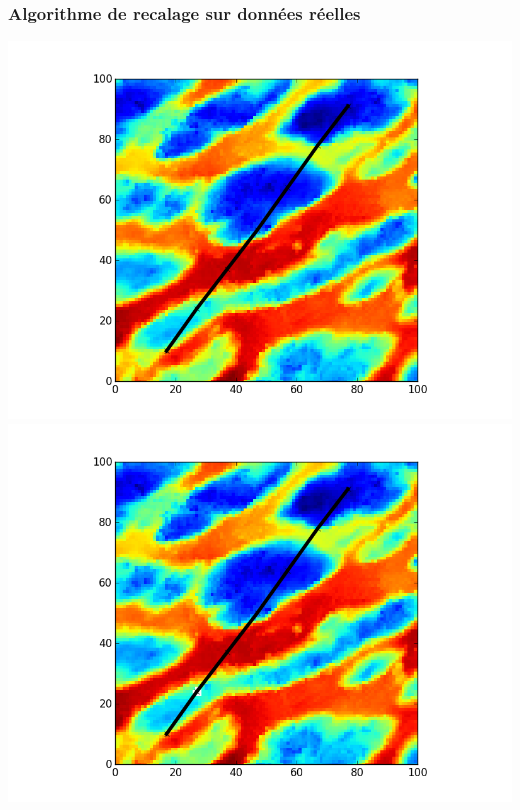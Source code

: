 \documentclass[11pt]{beamer}
\begin{document}

\begin{frame}

\frametitle{Algorithme de recalage sur données réelles}
\centering
\begin{overlayarea}{\textwidth}{\textheight}
 {\includegraphics[scale=.5]{../data/illustration_recalage_baseline/plot_A_10_17_B_91_77_iteration_000.png}}
 {\includegraphics[scale=.5]{../data/illustration_recalage_baseline/plot_A_10_17_B_91_77_iteration_001.png}}

\end{overlayarea}
\end{frame}
\end{document}
